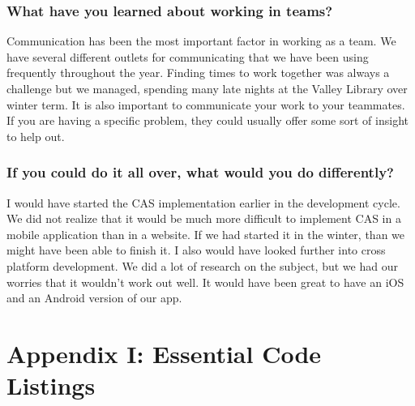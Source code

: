 \documentclass[onecolumn, draftclsnofoot,10pt, compsoc]{IEEEtran}
\begin{document}
    \subsubsection{What have you learned about working in teams?}
      Communication has been the most important factor in working as a team. We have several different outlets for communicating that we have been using frequently throughout the year. Finding times to work together was always a challenge but we managed, spending many late nights at the Valley Library over winter term. It is also important to communicate your work to your teammates. If you are having a specific problem, they could usually offer some sort of insight to help out.

    \subsubsection{\textbf{If you could do it all over, what would you do differently?}}
      I would have started the CAS implementation earlier in the development cycle. We did not realize that it would be much more difficult to implement CAS in a mobile application than in a website. If we had started it in the winter, than we might have been able to finish it. I also would have looked further into cross platform development. We did a lot of research on the subject, but we had our worries that it wouldn’t work out well. It would have been great to have an iOS and an Android version of our app.

  \newpage

\section{Appendix I: Essential Code Listings}
\end{document}
